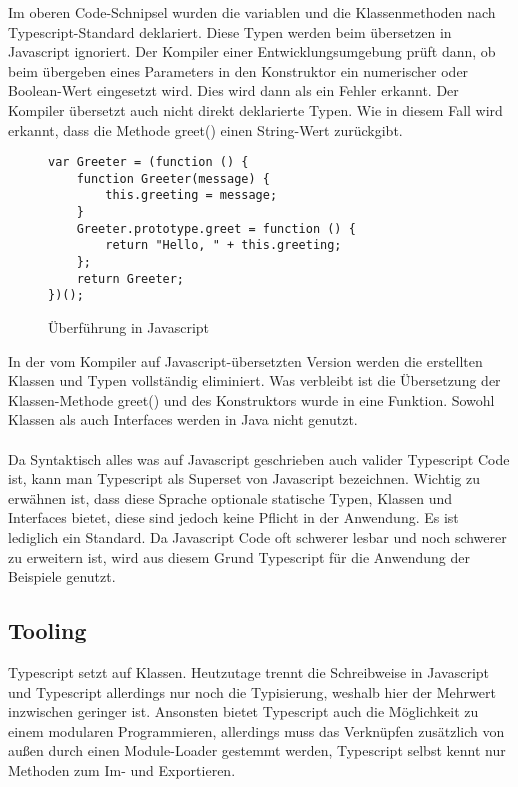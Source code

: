 Im oberen Code-Schnipsel wurden die variablen und die Klassenmethoden nach Typescript-Standard deklariert. Diese Typen werden beim übersetzen in Javascript ignoriert. Der Kompiler einer Entwicklungsumgebung prüft dann, ob beim übergeben eines Parameters in den Konstruktor ein numerischer oder Boolean-Wert eingesetzt wird. Dies wird dann als ein Fehler erkannt. Der Kompiler übersetzt auch nicht direkt deklarierte Typen. Wie in diesem Fall wird erkannt, dass die Methode greet() einen String-Wert zurückgibt.

\begin{figure}[t]
\begin{lstlisting}
var Greeter = (function () {
    function Greeter(message) {
        this.greeting = message;
    }
    Greeter.prototype.greet = function () {
        return "Hello, " + this.greeting;
    };
    return Greeter;
})(); 
\end{lstlisting}
\caption{Überführung in Javascript \cite{typescript-example}}
\end{figure}
In der vom Kompiler auf Javascript-übersetzten Version werden die erstellten Klassen und Typen vollständig eliminiert. Was verbleibt ist die Übersetzung der Klassen-Methode greet() und des Konstruktors wurde in eine Funktion. Sowohl Klassen als auch Interfaces werden in Java nicht genutzt.
\\\\
Da Syntaktisch alles was auf Javascript geschrieben auch valider Typescript Code ist, kann man Typescript als Superset von Javascript bezeichnen.
Wichtig zu erwähnen ist, dass diese Sprache optionale statische Typen, Klassen und Interfaces bietet, diese sind jedoch keine Pflicht in der Anwendung. Es ist lediglich ein Standard.
Da Javascript Code oft schwerer lesbar und noch schwerer zu erweitern ist, wird aus diesem Grund Typescript für die Anwendung der Beispiele genutzt.

\subsection{Tooling}

Typescript setzt auf Klassen. Heutzutage trennt die Schreibweise in Javascript und Typescript allerdings nur noch die Typisierung, weshalb hier der Mehrwert inzwischen geringer ist. Ansonsten bietet Typescript auch die Möglichkeit zu einem modularen Programmieren, allerdings muss das Verknüpfen zusätzlich von außen durch einen Module-Loader gestemmt werden, Typescript selbst kennt nur Methoden zum Im- und Exportieren.

